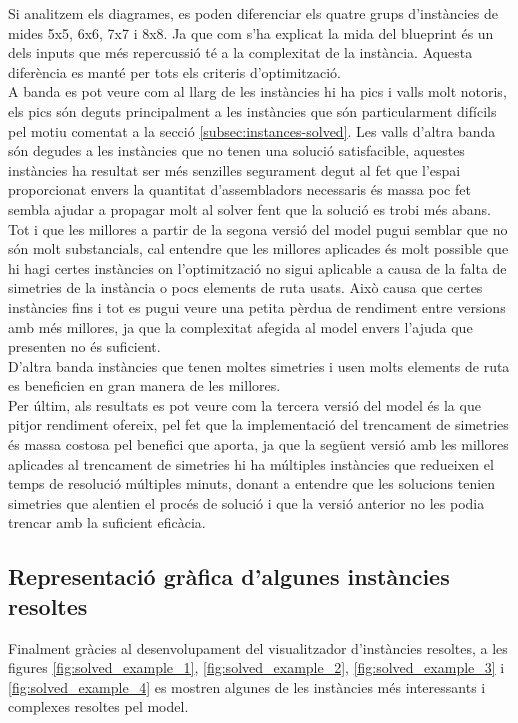 Si analitzem els diagrames, es poden diferenciar els quatre grups d'instàncies de mides 5x5, 6x6, 7x7 i 8x8. Ja que com s'ha explicat la mida del blueprint és un dels inputs que més repercussió té a la complexitat de la instància. Aquesta diferència es manté per tots els criteris d'optimització.\\
A banda es pot veure com al llarg de les instàncies hi ha pics i valls molt notoris, els pics són deguts principalment a les instàncies que són particularment difícils pel motiu comentat a la secció \ref{subsec:instances-solved}. Les valls d'altra banda són degudes a les instàncies que no tenen una solució satisfacible, aquestes instàncies ha resultat ser més senzilles segurament degut al fet que l'espai proporcionat envers la quantitat d'assembladors necessaris és massa poc fet sembla ajudar a propagar molt al solver fent que la solució es trobi més abans.\\
Tot i que les millores a partir de la segona versió del model pugui semblar que no són molt substancials, cal entendre que les millores aplicades és molt possible que hi hagi certes instàncies on l'optimització no sigui aplicable a causa de la falta de simetries de la instància o pocs elements de ruta usats. Això causa que certes instàncies fins i tot es pugui veure una petita pèrdua de rendiment entre versions amb més millores, ja que la complexitat afegida al model envers l'ajuda que presenten no és suficient.\\
D'altra banda instàncies que tenen moltes simetries i usen molts elements de ruta es beneficien en gran manera de les millores.\\
Per últim, als resultats es pot veure com la tercera versió del model és la que pitjor rendiment ofereix, pel fet que la implementació del trencament de simetries és massa costosa pel benefici que aporta, ja que la següent versió amb les millores aplicades al trencament de simetries hi ha múltiples instàncies que redueixen el temps de resolució múltiples minuts, donant a entendre que les solucions tenien simetries que alentien el procés de solució i que la versió anterior no les podia trencar amb la suficient eficàcia.

\subsection{Representació gràfica d'algunes instàncies resoltes}
Finalment gràcies al desenvolupament del visualitzador d'instàncies resoltes, a les figures \ref{fig:solved_example_1}, \ref{fig:solved_example_2}, \ref{fig:solved_example_3} i \ref{fig:solved_example_4} es mostren algunes de les instàncies més interessants i complexes resoltes pel model.

